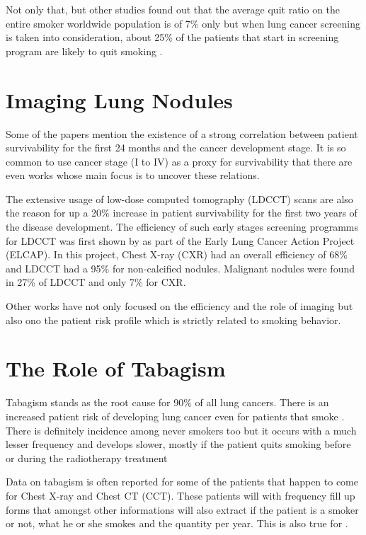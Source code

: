 Not only that, but other studies found out that the average quit ratio on the entire smoker worldwide population is of 7\% only but when lung  cancer screening is taken into consideration, about 25\% of the patients that start in screening program are likely to quit smoking \cite{fox2003}\cite{aalst2010}. %

\section{Imaging Lung Nodules}

Some of the papers mention the existence of a strong correlation between patient survivability for the first 24 months and the cancer development stage. It is so common to use cancer stage (I to IV) as a proxy for survivability that there are even works whose main focus is to uncover these relations\cite{roberts2013}\cite{fox2003}.

The extensive usage of low-dose computed tomography (LDCCT) scans are also the reason for up a 20\% increase in patient survivability for the first two years of the disease development\cite{fox2003}\cite{macredmond2006}\cite{mountain2008}\cite{jaklitsch2012}. The efficiency of such early stages screening programms for LDCCT was first shown by  as part of the Early Lung Cancer Action  Project (ELCAP). In this project, Chest X-ray (CXR) had an overall efficiency of 68\% and LDCCT had a 95\% for non-calcified nodules. Malignant nodules were found in 27\% of LDCCT and only 7\% for CXR. 

Other works have not only focused on the efficiency and the role of imaging but also ono the patient risk profile which is strictly related to smoking behavior.

\section{The Role of Tabagism}

Tabagism stands as the root cause for 90\% of all lung cancers. There is an increased patient risk of developing lung cancer even for patients that smoke \cite{ostroff2001}\cite{aalst2010}\cite{aalst2011}. There is definitely incidence among never smokers too but it occurs with a much lesser frequency and develops slower, mostly if the patient quits smoking before or during the radiotherapy treatment \cite{fox2003}\cite{wakalelee2007}

Data on tabagism is often reported for some of the patients that happen to come for Chest X-ray and Chest CT (CCT). These patients will with frequency fill up forms that amongst other informations will also extract if the patient is a smoker or not, what he or she smokes and the quantity per year. This is also true for \nomeHsl{}. 

